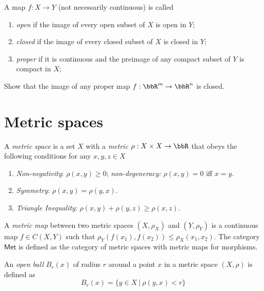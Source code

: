 \begin{defn}
A map $f:X\to Y$ (not necessarily continuous) is called
\begin{enumerate}
    \item \emph{open} if the image of every open subset of $X$ is open in $Y$;
    \item \emph{closed} if the image of every closed subset of $X$ is closed in $Y$;
    \item \emph{proper} if it is continuous and the preimage of any compact subset of $Y$ is compact in $X$;
\end{enumerate}
\end{defn}

\begin{xca}
   Show that the image of any proper map $f:\bbR^m\to\bbR^n$ is closed.
\end{xca}






\section{Metric spaces}

\begin{defn}
    A \emph{metric space} is a set $X$ with a \emph{metric} $\rho:X\times X\rightarrow \bbR $ that obeys the following conditions for any $x,y,z\in X$
\begin{enumerate}
    \item \emph{Non-negativity}: $\rho(x,y)\ge 0$; \emph{non-degeneracy:} $\rho(x,y)=0$ iff $x=y$.
    \item \emph{Symmetry}: $\rho(x,y) = \rho(y,x)$.
    \item \emph{Triangle Inequality}: $\rho(x,y) + \rho(y,z) \ge \rho(x,z)$.
\end{enumerate}
\end{defn}

\begin{defn}
    A \emph{metric map} between two metric spaces $(X,\rho_X)$ and $(Y,\rho_Y)$ is a continuous map $f\in C(X,Y)$ such that $\rho_Y (f(x_1),f(x_2))\leq \rho_X (x_1,x_2)$. The category $\mathsf{Met}$ is defined as the category of metric spaces with metric maps for morphisms.
\end{defn}

\begin{defn}
    An \emph{open ball} $B_r(x)$ of radius $r$ around a point $x$ in a metric space $(X,\rho)$ is defined as
\begin{equation}
    B_r(x) = \{ y\in X ~|~ \rho(y,x)< r \}
\end{equation}
\end{defn}


